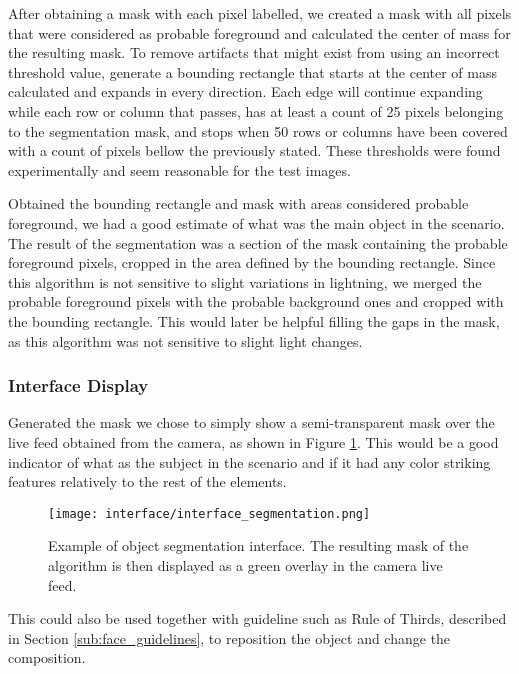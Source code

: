 After obtaining a mask with each pixel labelled, we created a mask with all pixels that were considered as probable foreground and calculated the center of mass for the resulting mask. To remove artifacts that might exist from using an incorrect threshold value, generate a bounding rectangle that starts at the center of mass calculated and expands in every direction. Each edge will continue expanding while each row or column that passes, has at least a count of 25 pixels belonging to the segmentation mask, and stops when 50 rows or columns have been covered with a count of pixels bellow the previously stated. These thresholds were found experimentally and seem reasonable for the test images.

Obtained the bounding rectangle and mask with areas considered probable foreground, we had a good estimate of what was the main object in the scenario. The result of the segmentation was a section of the mask containing the probable foreground pixels, cropped in the area defined by the bounding rectangle. Since this algorithm is not sensitive to slight variations in lightning, we merged the probable foreground pixels with the probable background ones and cropped with the bounding rectangle. This would later be helpful filling the gaps in the mask, as this algorithm was not sensitive to slight light changes.

\subsubsection{Interface Display}

Generated the mask we chose to simply show a semi-transparent mask over the live feed obtained from the camera, as shown in Figure \ref{fig:interface_segmentation}. This would be a good indicator of what as the subject in the scenario and if it had any color striking features relatively to the rest of the elements.

\begin{figure}[htbp]
	\centering
	\texttt{[image: interface/interface\_segmentation.png]}
    \caption{Example of object segmentation interface. The resulting mask of the algorithm is then displayed as a green overlay in the camera live feed.}
  	\label{fig:interface_segmentation}
\end{figure}

This could also be used together with guideline such as Rule of Thirds, described in Section \ref{sub:face_guidelines}, to reposition the object and change the composition.

